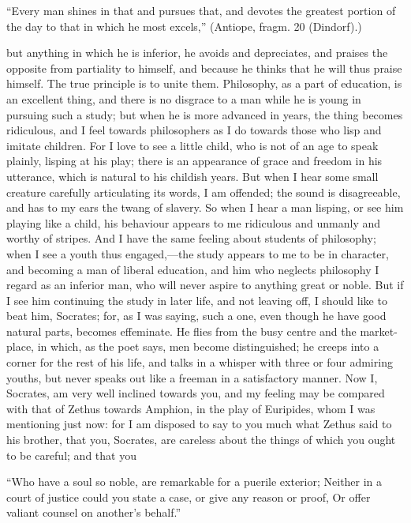 \documentclass[11pt,letter]{article}
\begin{document}
\par  “Every man shines in that and pursues that, and devotes the greatest portion of the day to that in which he most excels,” (Antiope, fragm. 20 (Dindorf).)

\par  but anything in which he is inferior, he avoids and depreciates, and praises the opposite from partiality to himself, and because he thinks that he will thus praise himself. The true principle is to unite them. Philosophy, as a part of education, is an excellent thing, and there is no disgrace to a man while he is young in pursuing such a study; but when he is more advanced in years, the thing becomes ridiculous, and I feel towards philosophers as I do towards those who lisp and imitate children. For I love to see a little child, who is not of an age to speak plainly, lisping at his play; there is an appearance of grace and freedom in his utterance, which is natural to his childish years. But when I hear some small creature carefully articulating its words, I am offended; the sound is disagreeable, and has to my ears the twang of slavery. So when I hear a man lisping, or see him playing like a child, his behaviour appears to me ridiculous and unmanly and worthy of stripes. And I have the same feeling about students of philosophy; when I see a youth thus engaged,—the study appears to me to be in character, and becoming a man of liberal education, and him who neglects philosophy I regard as an inferior man, who will never aspire to anything great or noble. But if I see him continuing the study in later life, and not leaving off, I should like to beat him, Socrates; for, as I was saying, such a one, even though he have good natural parts, becomes effeminate. He flies from the busy centre and the market-place, in which, as the poet says, men become distinguished; he creeps into a corner for the rest of his life, and talks in a whisper with three or four admiring youths, but never speaks out like a freeman in a satisfactory manner. Now I, Socrates, am very well inclined towards you, and my feeling may be compared with that of Zethus towards Amphion, in the play of Euripides, whom I was mentioning just now: for I am disposed to say to you much what Zethus said to his brother, that you, Socrates, are careless about the things of which you ought to be careful; and that you

\par  “Who have a soul so noble, are remarkable for a puerile exterior; Neither in a court of justice could you state a case, or give any reason or proof, Or offer valiant counsel on another’s behalf.”
\end{document}
